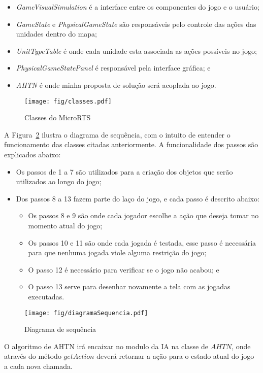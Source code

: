 \begin{itemize}
	\item \textit{GameVisualSimulation} é a interface entre os componentes do jogo e o usuário;
	\item \textit{GameState} e \textit{PhysicalGameState} são responsáveis pelo controle das ações das unidades dentro do mapa;
	\item \textit{UnitTypeTable} é onde cada unidade esta associada as ações possíveis no jogo;
	\item \textit{PhysicalGameStatePanel} é responsável pela interface gráfica; e
	\item \textit{AHTN} é onde minha proposta de solução será acoplada ao jogo.
\end{itemize}

\begin{figure}[ht]
	\centering
	\texttt{[image: fig/classes.pdf]}
	\caption{Classes do MicroRTS}
	\label{fig:classes}
\end{figure} 


A Figura~\ref{fig:sequencia} ilustra o diagrama de sequência, com o intuito de entender o funcionamento das classes citadas anteriormente. A funcionalidade dos passos são explicados abaixo: 
\begin{itemize}
	\item Os passos de 1 a 7 são utilizados para a criação dos objetos que serão utilizados ao longo do jogo;
	\item Dos passos 8 a 13 fazem parte do laço do jogo, e cada passo é descrito abaixo:
		\begin{itemize}
			\item Os passos 8 e 9 são onde cada jogador escolhe a ação que deseja tomar no momento atual do jogo;
			\item Os passos 10 e 11 são onde cada jogada é testada, esse passo é necessária para que nenhuma jogada viole alguma restrição do jogo; 
			\item O passo 12 é necessário para verificar se o jogo não acabou; e
			\item O passo 13 serve para desenhar novamente a tela com as jogadas executadas.
		\end{itemize}
\end{itemize}

\begin{figure}[ht]
	\centering
	\texttt{[image: fig/diagramaSequencia.pdf]}
	\caption{Diagrama de sequência}
	\label{fig:sequencia}
\end{figure}

O algoritmo de AHTN irá encaixar no modulo da IA na classe de $AHTN$, onde através do método $getAction$ deverá retornar a ação para o estado atual do jogo a cada nova chamada.